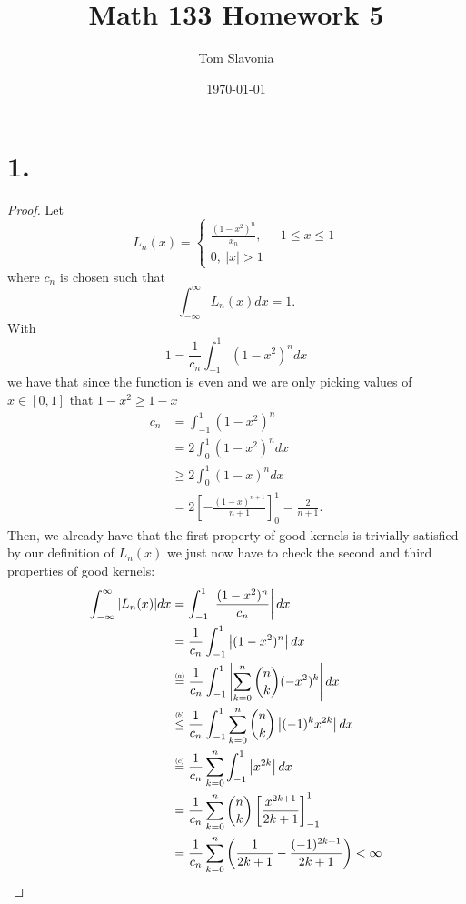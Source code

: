 \documentclass{article}
\title{Math 133 Homework 5}
\author{Tom Slavonia}
\date{\today}
\newcommand\numeq[1]%
  {\stackrel{\scriptscriptstyle(\mkern-1.5mu#1\mkern-1.5mu)}{=}}
\newcommand\numleq[1]
  {\stackrel{\scriptscriptstyle(\mkern-1.5mu#1\mkern-1.5mu)}{\leq}}
\begin{document}
\maketitle

\section*{1.}
\begin{proof}
    Let
    \[
    L_n(x) = \begin{cases}
        \frac{(1 - x^2)^n}{x_n}, \ -1 \leq x \leq 1 \\
        0, \ |x| > 1
    \end{cases}    
    \]
    where $c_n$ is chosen such that 
    \[
    \int_{-\infty}^{\infty}L_n(x)dx = 1.    
    \]
    With \[
    1 = \frac{1}{c_n} \int_{-1}^1(1 - x^2)^n dx    
    \]
    we have that since the function is even and we are only picking values of $x \in [0,1]$ that $1 - x^2 \geq 1 - x$ 
    \begin{align*}
        c_n &= \int_{-1}^1 (1 - x^2)^n \\
        &= 2 \int_0^1(1 - x^2)^n dx \\
        &\geq 2 \int_0^1 (1 - x)^n dx \\
        &= 2 \left[- \frac{(1 - x)^{n + 1}}{n + 1} \right]_0^1 = \frac{2}{n + 1}.
    \end{align*}
    Then, we already have that the first property of good kernels is trivially satisfied by our definition of $L_n(x)$ we just now have to check the second and third properties of good kernels: 
    \begin{align*}
        \int_{-\infty}^{\infty}|L_n(x)|dx &= \int_{-1}^1 \left|\frac{(1 - x^2)^n}{c_n}\right|dx \\
        &= \frac{1}{c_n} \int_{-1}^1\left|(1 - x^2)^n\right|dx \\
        &\numeq{a} \frac{1}{c_n}\int_{-1}^1\left|\sum\limits_{k = 0}^n{n \choose k}(-x^2)^k \right|dx \\
        &\numleq{b} \frac{1}{c_n} \int_{-1}^1 \sum\limits_{k = 0}^n{n \choose k} \left|(-1)^kx^{2k} \right|dx \\
        &\numeq{c} \frac{1}{c_n}\sum\limits_{k = 0}^n \int_{-1}^1\left|x^{2k}\right|dx \\
        &= \frac{1}{c_n} \sum\limits_{k = 0}^n{n \choose k} \left[\frac{x^{2k + 1}}{2k + 1} \right]_{-1}^1 \\
        &= \frac{1}{c_n} \sum\limits_{k = 0}^n \left(\frac{1}{2k + 1} - \frac{(-1)^{2k + 1}}{2k + 1}\right) < \infty

\end{align*}
\end{proof}
\end{document}
